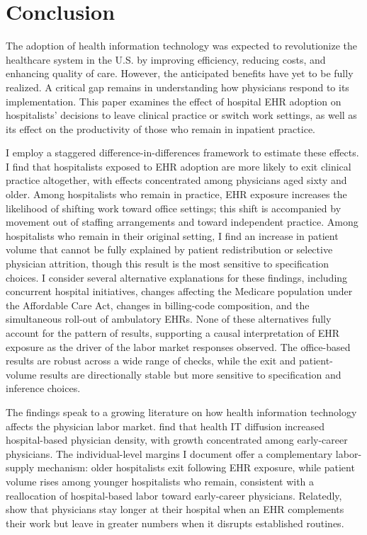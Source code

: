 \documentclass[12pt]{article}
\begin{document}
\section{Conclusion}

The adoption of health information technology was expected to revolutionize the healthcare system in the U.S. by improving efficiency, reducing costs, and enhancing quality of care. However, the anticipated benefits have yet to be fully realized. A critical gap remains in understanding how physicians respond to its implementation. This paper examines the effect of hospital EHR adoption on hospitalists' decisions to leave clinical practice or switch work settings, as well as its effect on the productivity of those who remain in inpatient practice.

I employ a staggered difference-in-differences framework to estimate these effects. I find that hospitalists exposed to EHR adoption are more likely to exit clinical practice altogether, with effects concentrated among physicians aged sixty and older. Among hospitalists who remain in practice, EHR exposure increases the likelihood of shifting work toward office settings; this shift is accompanied by movement out of staffing arrangements and toward independent practice. Among hospitalists who remain in their original setting, I find an increase in patient volume that cannot be fully explained by patient redistribution or selective physician attrition, though this result is the most sensitive to specification choices. I consider several alternative explanations for these findings, including concurrent hospital initiatives, changes affecting the Medicare population under the Affordable Care Act, changes in billing-code composition, and the simultaneous roll-out of ambulatory EHRs. None of these alternatives fully account for the pattern of results, supporting a causal interpretation of EHR exposure as the driver of the labor market responses observed. The office-based results are robust across a wide range of checks, while the exit and patient-volume results are directionally stable but more sensitive to specification and inference choices.

The findings speak to a growing literature on how health information technology affects the physician labor market. \citet{lin2026health} find that health IT diffusion increased hospital-based physician density, with growth concentrated among early-career physicians. The individual-level margins I document offer a complementary labor-supply mechanism: older hospitalists exit following EHR exposure, while patient volume rises among younger hospitalists who remain, consistent with a reallocation of hospital-based labor toward early-career physicians. Relatedly, \citet{greenwood2019does} show that physicians stay longer at their hospital when an EHR complements their work but leave in greater numbers when it disrupts established routines.
\end{document}
